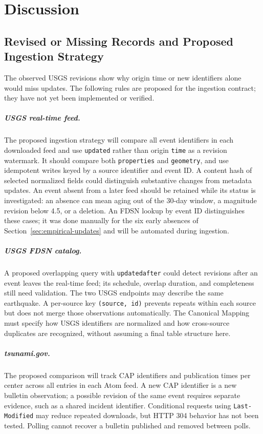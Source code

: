 \documentclass[a4paper,11pt,oneside]{book}
\begin{document}
\chapter{Discussion}
\label{ch:discussion}

\section{Revised or Missing Records and Proposed Ingestion Strategy}
The observed USGS revisions show why origin time or new identifiers
alone would miss updates. The following rules are proposed for the
ingestion contract; they have not yet been implemented or verified.

\paragraph{USGS real-time feed.}
The proposed ingestion strategy will compare all event identifiers in
each downloaded feed and use \texttt{updated} rather than origin
\texttt{time} as a revision watermark. It should compare both
\texttt{properties} and \texttt{geometry}, and use idempotent writes
keyed by a source identifier and event ID. A content hash of selected
normalized fields could distinguish substantive changes from metadata
updates. An event absent from a later feed should be retained while
its status is investigated: an absence can mean aging out of the 30-day window,
a magnitude revision below 4.5, or a deletion. An FDSN lookup by event ID
distinguishes these cases; it was done manually for the six early absences of
Section~\ref{sec:empirical-updates} and will be automated during ingestion.

\paragraph{USGS FDSN catalog.}
A proposed overlapping query with \texttt{updatedafter} could detect
revisions after an event leaves the real-time feed; its schedule,
overlap duration, and completeness still need validation. The two USGS
endpoints may describe the same earthquake. A per-source key
\texttt{(source, id)} prevents repeats within each source but does not
merge those observations automatically. The Canonical Mapping must
specify how USGS identifiers are normalized and how cross-source
duplicates are recognized, without assuming a final table structure here.

\paragraph{tsunami.gov.}
The proposed comparison will track CAP identifiers and publication
times per center across all entries in each Atom feed. A new CAP
identifier is a new bulletin observation; a possible revision of the
same event requires separate evidence, such as a shared incident
identifier. Conditional requests using \texttt{Last-Modified} may
reduce repeated downloads, but HTTP 304 behavior has not been tested.
Polling cannot recover a bulletin published and removed between polls.
\end{document}
